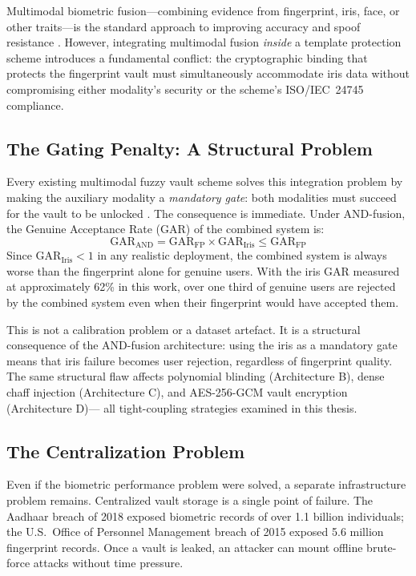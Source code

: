 Multimodal biometric fusion---combining evidence from fingerprint, iris, face, or
other traits---is the standard approach to improving accuracy and spoof
resistance \cite{ross2003information}. However, integrating multimodal fusion
\emph{inside} a template protection scheme introduces a fundamental conflict:
the cryptographic binding that protects the fingerprint vault must simultaneously
accommodate iris data without compromising either modality's security or the
scheme's ISO/IEC~24745 compliance.

\subsection{The Gating Penalty: A Structural Problem}

Every existing multimodal fuzzy vault scheme solves this integration problem by
making the auxiliary modality a \emph{mandatory gate}: both modalities must
succeed for the vault to be unlocked \cite{nandakumar2008multibiometric,
moon2010multibiometric}. The consequence is immediate. Under AND-fusion, the
Genuine Acceptance Rate (GAR) of the combined system is:
\begin{equation}
  \mathrm{GAR}_{\mathrm{AND}} = \mathrm{GAR}_{\mathrm{FP}}
  \times \mathrm{GAR}_{\mathrm{Iris}} \leq \mathrm{GAR}_{\mathrm{FP}}
\end{equation}
Since $\mathrm{GAR}_{\mathrm{Iris}} < 1$ in any realistic deployment, the
combined system is always worse than the fingerprint alone for genuine users.
With the iris GAR measured at approximately 62\% in this work, over one third
of genuine users are rejected by the combined system even when their fingerprint
would have accepted them.

This is not a calibration problem or a dataset artefact. It is a structural
consequence of the AND-fusion architecture: using the iris as a mandatory gate
means that iris failure becomes user rejection, regardless of fingerprint quality.
The same structural flaw affects polynomial blinding (Architecture B), dense chaff
injection (Architecture C), and AES-256-GCM vault encryption (Architecture D)---
all tight-coupling strategies examined in this thesis.

\subsection{The Centralization Problem}

Even if the biometric performance problem were solved, a separate infrastructure
problem remains. Centralized vault storage is a single point of failure. The
Aadhaar breach of 2018 exposed biometric records of over 1.1 billion individuals;
the U.S.\ Office of Personnel Management breach of 2015 exposed 5.6 million
fingerprint records. Once a vault is leaked, an attacker can mount offline
brute-force attacks without time pressure.

